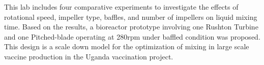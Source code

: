 This lab includes four comparative experiments to investigate the effects of rotational speed, impeller type, baffles, and number of impellers on liquid mixing time. Based on the results, a bioreactor prototype involving one Rushton Turbine and one Pitched-blade operating at 280rpm under baffled condition was proposed. This design is a scale down model for the optimization of mixing in large scale vaccine production in the Uganda vaccination project. 